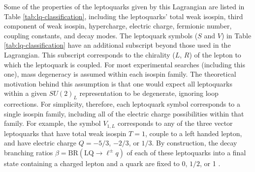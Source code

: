 Some of the properties of the leptoquarks given by this Lagrangian
are listed in Table \ref{tab:lq-classification},
including the leptoquarks' total weak isospin, third component 
of weak isospin, hypercharge, electric charge, fermionic number, coupling constants,
and decay modes.
The leptoquark symbols ($S$ and $V$) in Table \ref{tab:lq-classification} have
an additional subscript beyond those used in the Lagrangian.  
This subscript corresponds to the chirality ($L$, $R$)
of the lepton to which the leptoquark is coupled.
For most experimental searches (including this one), mass degeneracy is assumed within each
isospin family.  The theoretical motivation behind this assumption is that one
would expect all leptoquarks within a given $SU(2)_{L}$ representation to be degenerate,
ignoring loop corrections.  For simplicity, therefore, each leptoquark symbol corresponds
to a single isospin family, including all of the electric charge possibilities within that family.
For example, the symbol $V_{1,L}$ corresponds to any of the three vector leptoquarks that 
have total weak isospin $T = 1$, couple to a left handed lepton,
 and have electric charge $Q = -5/3$, $-2/3$, or $1/3$.  By construction, the decay branching
ratios $\beta = \text{BR}(\text{LQ}\rightarrow\ell^{\pm} q)$ of each of these leptoquarks into a final state
containing a charged lepton and a quark are fixed to 0, $1/2$, or 1 \cite{mBRW2}.

